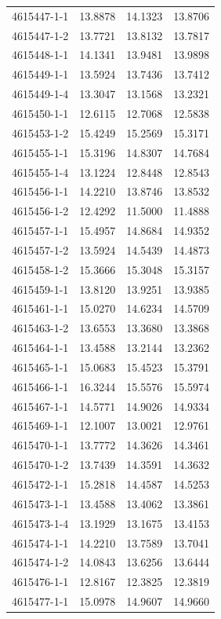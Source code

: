 \begin{longtable}{lrrr}
4615447-1-1 & 13.8878 & 14.1323 & 13.8706 \\
4615447-1-2 & 13.7721 & 13.8132 & 13.7817 \\
4615448-1-1 & 14.1341 & 13.9481 & 13.9898 \\
4615449-1-1 & 13.5924 & 13.7436 & 13.7412 \\
4615449-1-4 & 13.3047 & 13.1568 & 13.2321 \\
4615450-1-1 & 12.6115 & 12.7068 & 12.5838 \\
4615453-1-2 & 15.4249 & 15.2569 & 15.3171 \\
4615455-1-1 & 15.3196 & 14.8307 & 14.7684 \\
4615455-1-4 & 13.1224 & 12.8448 & 12.8543 \\
4615456-1-1 & 14.2210 & 13.8746 & 13.8532 \\
4615456-1-2 & 12.4292 & 11.5000 & 11.4888 \\
4615457-1-1 & 15.4957 & 14.8684 & 14.9352 \\
4615457-1-2 & 13.5924 & 14.5439 & 14.4873 \\
4615458-1-2 & 15.3666 & 15.3048 & 15.3157 \\
4615459-1-1 & 13.8120 & 13.9251 & 13.9385 \\
4615461-1-1 & 15.0270 & 14.6234 & 14.5709 \\
4615463-1-2 & 13.6553 & 13.3680 & 13.3868 \\
4615464-1-1 & 13.4588 & 13.2144 & 13.2362 \\
4615465-1-1 & 15.0683 & 15.4523 & 15.3791 \\
4615466-1-1 & 16.3244 & 15.5576 & 15.5974 \\
4615467-1-1 & 14.5771 & 14.9026 & 14.9334 \\
4615469-1-1 & 12.1007 & 13.0021 & 12.9761 \\
4615470-1-1 & 13.7772 & 14.3626 & 14.3461 \\
4615470-1-2 & 13.7439 & 14.3591 & 14.3632 \\
4615472-1-1 & 15.2818 & 14.4587 & 14.5253 \\
4615473-1-1 & 13.4588 & 13.4062 & 13.3861 \\
4615473-1-4 & 13.1929 & 13.1675 & 13.4153 \\
4615474-1-1 & 14.2210 & 13.7589 & 13.7041 \\
4615474-1-2 & 14.0843 & 13.6256 & 13.6444 \\
4615476-1-1 & 12.8167 & 12.3825 & 12.3819 \\
4615477-1-1 & 15.0978 & 14.9607 & 14.9660 \\

\end{longtable}
